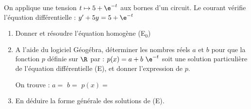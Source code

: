 On applique une tension $t\mapsto 5+\e^{-t}$ aux bornes d'un circuit. Le courant vérifie l'équation différentielle : $y'+5y=5+\e^{-t}$

\begin{enumerate}
	\item Donner et résoudre l'équation homogène (E$_0$)\par \vspace*{0.5cm}

	\item A l’aide du logiciel Géogébra, déterminer les nombres réels $a$ et $b$ pour que la fonction $p$ définie sur $\R$ par : $p(x) = a + b~\e^{-t}$ soit une solution particulière de l'équation différentielle (E), et donner l’expression de $p$. 
	
	On trouve : $a=$\makebox[0.1\linewidth]{\dotfill} \hfill $b=$\makebox[0.1\linewidth]{\dotfill} \hfill $p(x)=$\makebox[0.3\linewidth]{\dotfill}

	\smallskip
	
	\appelprof
	\item En déduire la forme générale des solutions de (E).\par \vspace*{0.5cm}

\end{enumerate}